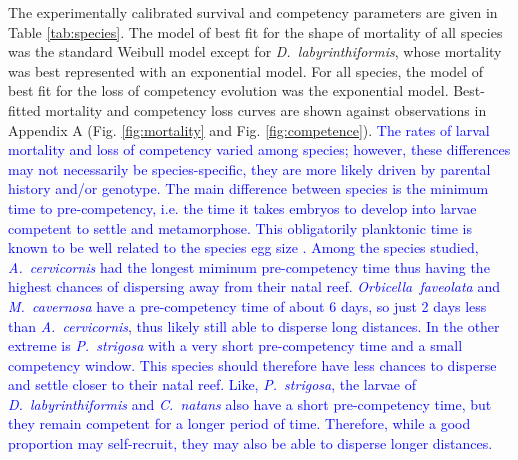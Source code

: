 \documentclass[preprint,12pt,authoryear]{elsarticle}
\newcommand{\modif}[1]{\textcolor{blue}{#1}}
\begin{document}
	The experimentally calibrated survival and competency parameters are given in Table \ref{tab:species}.  The model of best fit for the shape of mortality of all species was the standard Weibull model except for \textit{D.~labyrinthiformis}, whose mortality was best represented with an exponential model. For all species, the model of best fit for the loss of competency evolution was the exponential model. Best-fitted mortality and competency loss curves are shown against observations in Appendix A (Fig. \ref{fig:mortality} and Fig. \ref{fig:competence}). \modif{The rates of larval mortality and loss of competency varied among species; however, these differences may not necessarily be species-specific, they are more likely driven by parental history and/or genotype. The main difference between species is the minimum time to pre-competency, i.e. the time it takes embryos to develop into larvae competent to settle and metamorphose. This obligatorily planktonic time is known to be well related to the species egg size \citep{figueiredo2013synthesizing}. Among the species studied, \textit{A.~cervicornis} had the longest miminum pre-competency time thus having the highest chances of dispersing away from their natal reef. \textit{Orbicella~faveolata} and \textit{M.~cavernosa} have a pre-competency time of about 6 days, so just 2 days less than \textit{A.~cervicornis}, thus likely still able to disperse long distances. In the other extreme is \textit{P.~strigosa} with a very short pre-competency time and a small competency window. This species should therefore have less chances to disperse and settle closer to their natal reef. Like, \textit{P.~strigosa}, the larvae of \textit{D.~labyrinthiformis} and \textit{C.~natans} also have a short pre-competency time, but they remain competent for a longer period of time. Therefore, while a good proportion may self-recruit, they may also be able to disperse longer distances.}
	
	
	
	
\end{document}
